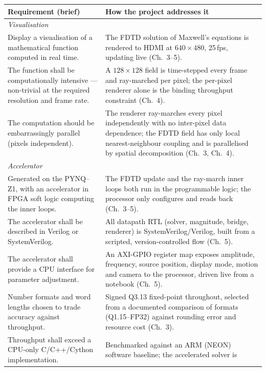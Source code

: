 \documentclass[11pt]{report}
\begin{document}
\begin{table}[h]
\centering
\renewcommand{\arraystretch}{1.25}
\begin{tabular}{|p{}|p{}|}
\hline
\textbf{Requirement (brief)} & \textbf{How the project addresses it} \\
\hline
\multicolumn{2}{|l|}{\textit{Visualisation}}\\
\hline
Display a visualisation of a mathematical function computed in real time. &
The FDTD solution of Maxwell's equations is rendered to HDMI at $640\times480$,
25\,fps, updating live (Ch.~3--5). \\
\hline
The function shall be computationally intensive --- non-trivial at the required
resolution and frame rate. &
A $128\times128$ field is time-stepped every frame and ray-marched per pixel; the
per-pixel renderer alone is the binding throughput constraint (Ch.~4). \\
\hline
The computation should be embarrassingly parallel (pixels independent). &
The renderer ray-marches every pixel independently with no inter-pixel data
dependence; the FDTD field has only local nearest-neighbour coupling and is
parallelised by spatial decomposition (Ch.~3, Ch.~4). \\
\hline
\multicolumn{2}{|l|}{\textit{Accelerator}}\\
\hline
Generated on the PYNQ--Z1, with an accelerator in FPGA soft logic computing the
inner loops. &
The FDTD update and the ray-march inner loops both run in the programmable logic;
the processor only configures and reads back (Ch.~3--5). \\
\hline
The accelerator shall be described in Verilog or SystemVerilog. &
All datapath RTL (solver, magnitude, bridge, renderer) is SystemVerilog/Verilog,
built from a scripted, version-controlled flow (Ch.~5). \\
\hline
The accelerator shall provide a CPU interface for parameter adjustment. &
An AXI-GPIO register map exposes amplitude, frequency, source position, display
mode, motion and camera to the processor, driven live from a notebook (Ch.~5). \\
\hline
Number formats and word lengths chosen to trade accuracy against throughput. &
Signed Q3.13 fixed-point throughout, selected from a documented comparison of
formats (Q1.15--FP32) against rounding error and resource cost (Ch.~3). \\
\hline
Throughput shall exceed a CPU-only C/C++/Cython implementation. &
Benchmarked against an ARM (NEON) software baseline; the accelerated solver is

\end{tabular}
\end{table}
\end{document}
